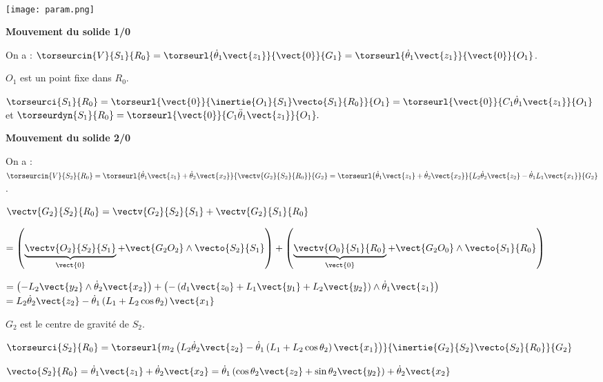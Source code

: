 \ifprof
\begin{corrige}~\\


\begin{center}
\texttt{[image: param.png]}
\end{center}


\textbf{Mouvement du solide 1/0}

On a : 
$\torseurcin{V}{S_1}{R_0}=\torseurl{\dot{\theta}_1 \vect{z_1}}{\vect{0}}{G_1}=\torseurl{\dot{\theta}_1 \vect{z_1}}{\vect{0}}{O_1}$. 

$O_1$ est un point fixe dans $R_0$. 

$\torseurci{S_1}{R_0}
=\torseurl{
\vect{0}
}{
\inertie{O_1}{S_1}\vecto{S_1}{R_0}
}{O_1}
=\torseurl{
\vect{0}
}{
C_1\dot{\theta}_1\vect{z_1}
}{O_1}
$ 
et 
$\torseurdyn{S_1}{R_0}
=\torseurl{
\vect{0}
}{
C_1\ddot{\theta}_1\vect{z_1}
}{O_1}
.$

\textbf{Mouvement du solide 2/0}

On a : 
$\torseurcin{V}{S_2}{R_0}
=\torseurl{\dot{\theta}_1 \vect{z_1}+\dot{\theta}_2 \vect{x_2}}{\vectv{G_2}{S_2}{R_0}}{G_2}
=\torseurl{\dot{\theta}_1 \vect{z_1}+\dot{\theta}_2 \vect{x_2}}{
 L_2 \dot{\theta}_2 \vect{z_2}-\dot{\theta}_1L_1\vect{x_1}
}{G_2}$. 

$\vectv{G_2}{S_2}{R_0}=\vectv{G_2}{S_2}{S_1}+\vectv{G_2}{S_1}{R_0}$

$=
\left( \underbrace{\vectv{O_2}{S_2}{S_1}}_{\vect{0}}+\vect{G_2O_2}\wedge \vecto{S_2}{S_1}\right)
+ \left( \underbrace{\vectv{O_0}{S_1}{R_0}}_{\vect{0}}+\vect{G_2O_0}\wedge \vecto{S_1}{R_0}\right)$

$=
\left( -L_2\vect{y_2}\wedge \dot{\theta}_2 \vect{x_2}\right)
+ \left(-\left( d_1\vect{z_0}+L_1\vect{y_1}+L_2\vect{y_2} \right)\wedge \dot{\theta}_1 \vect{z_1}\right)$
$=
 L_2 \dot{\theta}_2 \vect{z_2}-
\dot{\theta}_1\left (L_1+L_2 \cos\theta_2 \right)\vect{x_1}
$

$G_2$ est le centre de gravité de $S_2$. 

$\torseurci{S_2}{R_0}
=\torseurl{
m_2\left(   L_2 \dot{\theta}_2 \vect{z_2}-\dot{\theta}_1\left (L_1+L_2 \cos\theta_2 \right)\vect{x_1}\right)
}{
\inertie{G_2}{S_2}\vecto{S_2}{R_0}
}{G_2}
$

$\vecto{S_2}{R_0}
=\dot{\theta}_1 \vect{z_1}+\dot{\theta}_2 \vect{x_2}
=\dot{\theta}_1 \left( \cos\theta_2 \vect{z_2}+\sin\theta_2 \vect{y_2} \right)+\dot{\theta}_2 \vect{x_2}
$


\end{corrige}
